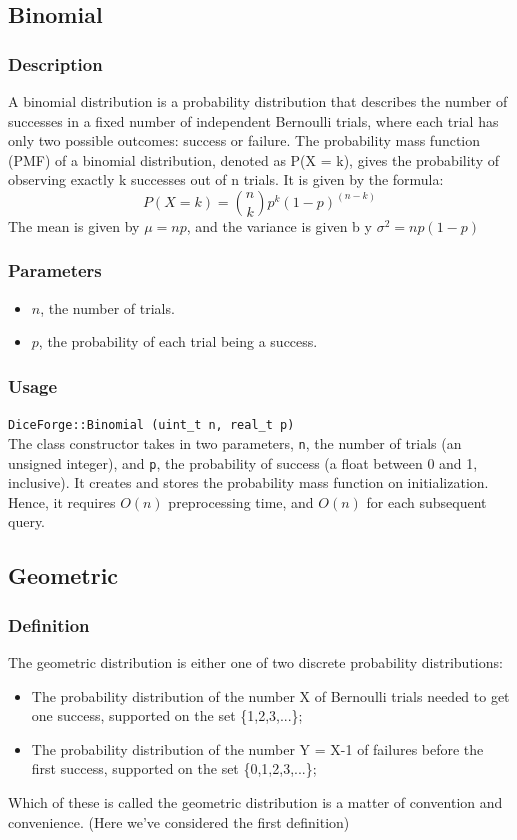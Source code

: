 \documentclass[titlepage, 11pt]{article}
\newcommand{\code}[1]
{\colorbox{light-gray}{\texttt{#1}}}
\begin{document}
\subsection{Binomial}
\subsubsection{Description}
A binomial distribution is a probability distribution that describes the number of successes in a fixed number of independent Bernoulli trials, where each trial has only two possible outcomes: success or failure. 
The probability mass function (PMF) of a binomial distribution, denoted as P(X = k), gives the probability of observing exactly k successes out of n trials. It is given by the formula:
$$P(X = k) = \binom{n}{k}p^k(1-p)^{(n-k)}$$
The mean is given by $\mu = np$, and the variance is given b y $\sigma^2 = np(1-p)$
\subsubsection{Parameters}
\begin{itemize}
    \item $n$, the number of trials.
    \item $p$, the probability of each trial being a success.
\end{itemize}
\subsubsection{Usage}
\code{DiceForge::Binomial (uint\_t n, real\_t p)}\\
The class constructor takes in two parameters, \code{n}, the number of trials (an unsigned integer), and \code{p}, the probability of success (a float between 0 and 1, inclusive). It creates and stores the probability mass function on initialization. Hence, it requires $O(n)$ preprocessing time, and $O(n)$ for each subsequent query.\newline

\subsection{Geometric}
\subsubsection{Definition}
The geometric distribution is either one of two discrete probability distributions:
\begin{itemize}
    \item The probability distribution of the number X of Bernoulli trials needed to get one success, supported on the set \{1,2,3,...\};
    \item The probability distribution of the number Y = X-1 of failures before the first success, supported on the set \{0,1,2,3,...\};
\end{itemize}
Which of these is called the geometric distribution is a matter of convention and convenience. (Here we've considered the first definition)
\end{document}
